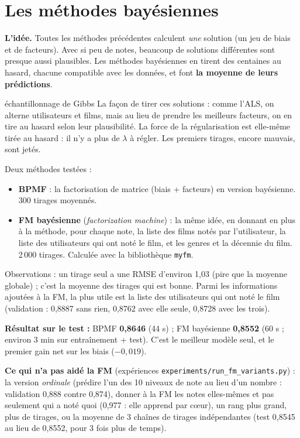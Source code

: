 \documentclass[11pt,a4paper]{article}
\newcommand{\resultat}[1]{\par\textbf{Résultat sur le test :} #1\par}
\begin{document}
\section{Les méthodes bayésiennes}

\textbf{L'idée.} Toutes les méthodes précédentes calculent \emph{une} solution (un jeu de
biais et de facteurs). Avec si peu de notes, beaucoup de solutions différentes sont presque
aussi plausibles. Les méthodes bayésiennes en tirent des centaines au hasard, chacune
compatible avec les données, et font \textbf{la moyenne de leurs prédictions}.

\begin{definition}{échantillonnage de Gibbs}
La façon de tirer ces solutions : comme l'ALS, on alterne utilisateurs et films, mais au lieu
de prendre les meilleurs facteurs, on en tire au hasard selon leur plausibilité. La force
de la régularisation est elle-même tirée au hasard : il n'y a plus de $\lambda$ à régler.
Les premiers tirages, encore mauvais, sont jetés.
\end{definition}

Deux méthodes testées :
\begin{itemize}
  \item \textbf{BPMF} : la factorisation de matrice (biais + facteurs) en version
        bayésienne. 300 tirages moyennés.
  \item \textbf{FM bayésienne} (\emph{factorization machine}) : la même idée, en donnant
        en plus à la méthode, pour chaque note, la liste des films notés par l'utilisateur,
        la liste des utilisateurs qui ont noté le film, et les genres et la décennie du film.
        2\,000 tirages. Calculée avec la bibliothèque \texttt{myfm}.
\end{itemize}

Observations : un tirage seul a une RMSE d'environ 1,03 (pire que la moyenne globale) ;
c'est la moyenne des tirages qui est bonne. Parmi les informations ajoutées à la FM, la
plus utile est la liste des utilisateurs qui ont noté le film (validation : 0,8887 sans
rien, 0,8762 avec elle seule, 0,8728 avec les trois).

\resultat{BPMF \textbf{0,8646} (44 s) ; FM bayésienne \textbf{0,8552} (60 s ; environ
3 min sur entraînement + test). C'est le meilleur modèle seul, et le premier gain net sur
les biais ($-0{,}019$).}

\textbf{Ce qui n'a pas aidé la FM} (expériences \texttt{experiments/run\_fm\_variants.py}) :
la version \emph{ordinale} (prédire l'un des 10 niveaux de note au lieu d'un nombre :
validation 0,888 contre 0,874), donner à la FM les notes elles-mêmes et pas seulement
\og qui a noté quoi \fg{} (0,977 : elle apprend par c\oe ur), un rang plus grand, plus de
tirages, ou la moyenne de 3 chaînes de tirages indépendantes (test 0,8545 au lieu de
0,8552, pour 3 fois plus de temps).
\end{document}
